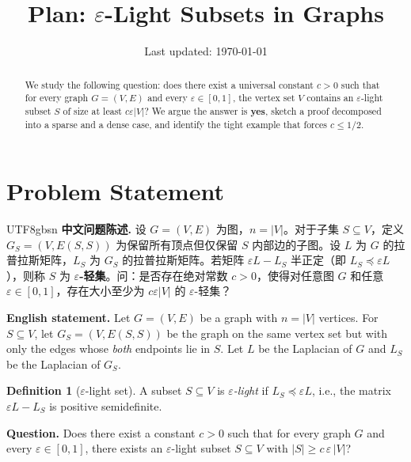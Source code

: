 \documentclass[12pt]{article}
\title{Plan: $\varepsilon$-Light Subsets in Graphs}
\author{}
\date{Last updated: \today}
\theoremstyle{definition}
\newtheorem{definition}[theorem]{Definition}
\theoremstyle{remark}
\begin{document}
\maketitle

\begin{abstract}
We study the following question: does there exist a universal constant $c > 0$ such that for every graph $G = (V,E)$ and every $\varepsilon \in [0,1]$, the vertex set $V$ contains an $\varepsilon$-light subset $S$ of size at least $c\varepsilon|V|$?  We argue the answer is \textbf{yes}, sketch a proof decomposed into a sparse and a dense case, and identify the tight example that forces $c \le 1/2$.
\end{abstract}

\section{Problem Statement}

\begin{CJK}{UTF8}{gbsn}
\textbf{中文问题陈述.} 设 $G = (V,E)$ 为图，$n = |V|$。对于子集 $S \subseteq V$，定义 $G_S = (V, E(S,S))$ 为保留所有顶点但仅保留 $S$ 内部边的子图。设 $L$ 为 $G$ 的拉普拉斯矩阵，$L_S$ 为 $G_S$ 的拉普拉斯矩阵。若矩阵 $\varepsilon L - L_S$ 半正定（即 $L_S \preceq \varepsilon L$），则称 $S$ 为 \textbf{$\varepsilon$-轻集}。问：是否存在绝对常数 $c > 0$，使得对任意图 $G$ 和任意 $\varepsilon \in [0,1]$，存在大小至少为 $c\varepsilon|V|$ 的 $\varepsilon$-轻集？
\end{CJK}

\bigskip

\textbf{English statement.}
Let $G = (V,E)$ be a graph with $n = |V|$ vertices.  For $S \subseteq V$, let
$G_S = (V, E(S,S))$ be the graph on the same vertex set but with only the edges
whose \emph{both} endpoints lie in $S$.  Let $L$ be the Laplacian of $G$ and $L_S$ be the Laplacian of $G_S$.

\begin{definition}[$\varepsilon$-light set]
A subset $S \subseteq V$ is \emph{$\varepsilon$-light} if
$L_S \preceq \varepsilon L$, i.e., the matrix $\varepsilon L - L_S$ is positive semidefinite.
\end{definition}

\textbf{Question.} Does there exist a constant $c > 0$ such that for every graph $G$ and every $\varepsilon \in [0,1]$, there exists an $\varepsilon$-light subset $S \subseteq V$ with $|S| \ge c\,\varepsilon\,|V|$?
\end{document}
